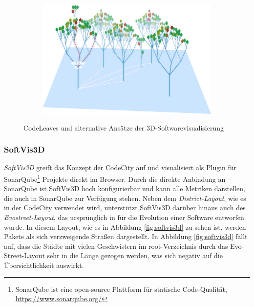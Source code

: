 \begin{figure}[htb]
\begin{subfigure}[b]{\fwidth}
  	 \label{fig:code-universe}
  \end{subfigure}
  \hfill
  \begin{subfigure}[b]{\fwidth}
  	\includegraphics[width=\textwidth]{figures/code-leaves}
  	 \label{fig:code-leaves}
  \end{subfigure}
  \caption{CodeLeaves und alternative Ansätze der 3D-Softwarevisualisierung} \label{fig:alternatives}
\end{figure}

\subsubsection*{SoftVis3D}
\textit{SoftVis3D} greift das Konzept der CodeCity auf und visualisiert als Plugin für SonarQube\footnote{SonarQube ist eine open-source Plattform für statische Code-Qualität, \url{https://www.sonarqube.org/}} Projekte direkt im Browser. Durch die direkte Anbindung an SonarQube ist SoftVis3D hoch konfigurierbar und kann alle Metriken darstellen, die auch in SonarQube zur Verfügung stehen. Neben dem \emph{District-Layout}, wie es in der CodeCity verwendet wird, unterstützt SoftVis3D darüber hinaus auch des \emph{Evostreet-Layout}, das ursprünglich in \cite{steinbruckner2013consistent} für die Evolution einer Software entworfen wurde. In diesem Layout, wie es in Abbildung \ref{fig:softvis3d} zu sehen ist, werden Pakete als sich verzweigende Straßen dargestellt. In Abbildung \ref{fig:softvis3d} fällt auf, dass die Städte mit vielen Geschwistern im root-Verzeichnis durch das Evo-Street-Layout sehr in die Länge gezogen werden, was sich negativ auf die Übersichtlichkeit auswirkt.

